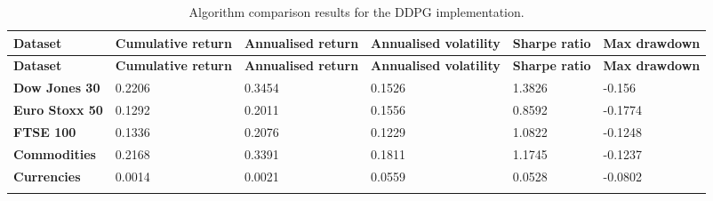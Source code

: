 \begin{longtable}{|l|p{2.1cm}|p{2.1cm}|p{2.1cm}|p{1.5cm}|p{2cm}|}
    \hline
    \textbf{Dataset} & \textbf{Cumulative return} & \textbf{Annualised return} & \textbf{Annualised volatility} & \textbf{Sharpe ratio} & \textbf{Max drawdown}  \\ \midrule
    \endfirsthead

    \hline
    \textbf{Dataset} & \textbf{Cumulative return} & \textbf{Annualised return} & \textbf{Annualised volatility} & \textbf{Sharpe ratio} & \textbf{Max drawdown}  \\ \midrule
    \endhead

    \endfoot
    \hline

    \textbf{Dow Jones 30} & 0.2206 & 0.3454 & 0.1526 & 1.3826 & -0.156 \\ \hline
    \textbf{Euro Stoxx 50} & 0.1292 & 0.2011 & 0.1556 & 0.8592 & -0.1774 \\ \hline
    \textbf{FTSE 100} & 0.1336 & 0.2076 & 0.1229 & 1.0822 & -0.1248 \\ \hline
    \textbf{Commodities} & 0.2168 & 0.3391 & 0.1811 & 1.1745 & -0.1237 \\ \hline
    \textbf{Currencies} & 0.0014 & 0.0021 & 0.0559 & 0.0528 & -0.0802 \\ \hline

    \caption{Algorithm comparison results for the DDPG implementation.}
    \label{tab:experiment_algorithms_ddpg}
\end{longtable}